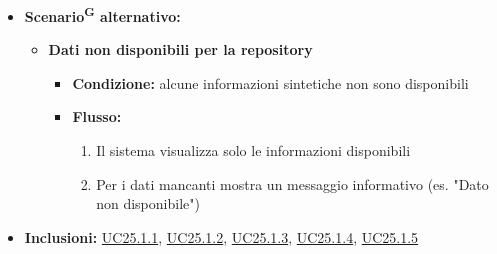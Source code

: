 \documentclass[a4paper, 11pt]{article}
\begin{document}
\begin{itemize}
\begin{enumerate}
\begin{itemize}
			\item Il voto della documentazione\textsuperscript{G} (\hyperref[UC25.1.4]{UC25.1.4})
			\item La percentuale di code coverage\textsuperscript{G} (\hyperref[UC25.1.5]{UC25.1.5})
		\end{itemize}
	\end{enumerate}
	\item \textbf{Scenario\textsuperscript{G} alternativo:}
	\begin{itemize}
		\item \textbf{Dati non disponibili per la repository}
		\begin{itemize}
			\item \textbf{Condizione:} alcune informazioni sintetiche non sono disponibili
			\item \textbf{Flusso:}
			\begin{enumerate}
				\item Il sistema visualizza solo le informazioni disponibili
				\item Per i dati mancanti mostra un messaggio informativo (es. "Dato non disponibile")
			\end{enumerate}
		\end{itemize}
	\end{itemize}
	\item \textbf{Inclusioni:} \hyperref[UC25.1.1]{UC25.1.1}, \hyperref[UC25.1.2]{UC25.1.2}, \hyperref[UC25.1.3]{UC25.1.3}, \hyperref[UC25.1.4]{UC25.1.4}, \hyperref[UC25.1.5]{UC25.1.5}
\end{itemize}
\end{document}
